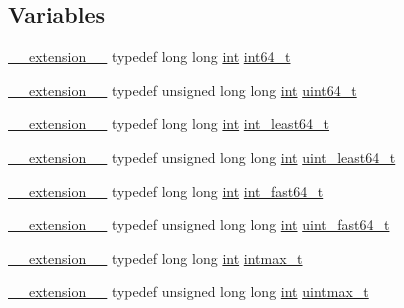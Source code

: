 \subsection*{Variables}
\begin{DoxyCompactItemize}
\item 
\hyperlink{cdefs_8h_a586c6a171eb0104d519dc0eda5284ef7}{\+\_\+\+\_\+extension\+\_\+\+\_\+} typedef long long \hyperlink{xmltok_8h_a5a0d4a5641ce434f1d23533f2b2e6653}{int} \hyperlink{win_2_l_a_d_s_p_a__plugins-win_2glibc__includes_2stdint_8h_a10c9f200669fac0da850346f08196ed6}{int64\+\_\+t}
\item 
\hyperlink{cdefs_8h_a586c6a171eb0104d519dc0eda5284ef7}{\+\_\+\+\_\+extension\+\_\+\+\_\+} typedef unsigned long long \hyperlink{xmltok_8h_a5a0d4a5641ce434f1d23533f2b2e6653}{int} \hyperlink{win_2_l_a_d_s_p_a__plugins-win_2glibc__includes_2stdint_8h_a246b33e9233313797d7dc7d7700d2148}{uint64\+\_\+t}
\item 
\hyperlink{cdefs_8h_a586c6a171eb0104d519dc0eda5284ef7}{\+\_\+\+\_\+extension\+\_\+\+\_\+} typedef long long \hyperlink{xmltok_8h_a5a0d4a5641ce434f1d23533f2b2e6653}{int} \hyperlink{win_2_l_a_d_s_p_a__plugins-win_2glibc__includes_2stdint_8h_a259be097d134995315efb0e4fcbfea9d}{int\+\_\+least64\+\_\+t}
\item 
\hyperlink{cdefs_8h_a586c6a171eb0104d519dc0eda5284ef7}{\+\_\+\+\_\+extension\+\_\+\+\_\+} typedef unsigned long long \hyperlink{xmltok_8h_a5a0d4a5641ce434f1d23533f2b2e6653}{int} \hyperlink{win_2_l_a_d_s_p_a__plugins-win_2glibc__includes_2stdint_8h_acec37aa98922d60b79f09bb8f3da383f}{uint\+\_\+least64\+\_\+t}
\item 
\hyperlink{cdefs_8h_a586c6a171eb0104d519dc0eda5284ef7}{\+\_\+\+\_\+extension\+\_\+\+\_\+} typedef long long \hyperlink{xmltok_8h_a5a0d4a5641ce434f1d23533f2b2e6653}{int} \hyperlink{win_2_l_a_d_s_p_a__plugins-win_2glibc__includes_2stdint_8h_a1e054ce166a0bc2f7af5fa4431abfb65}{int\+\_\+fast64\+\_\+t}
\item 
\hyperlink{cdefs_8h_a586c6a171eb0104d519dc0eda5284ef7}{\+\_\+\+\_\+extension\+\_\+\+\_\+} typedef unsigned long long \hyperlink{xmltok_8h_a5a0d4a5641ce434f1d23533f2b2e6653}{int} \hyperlink{win_2_l_a_d_s_p_a__plugins-win_2glibc__includes_2stdint_8h_a579cef9bed8d6c81908a78149019c8d6}{uint\+\_\+fast64\+\_\+t}
\item 
\hyperlink{cdefs_8h_a586c6a171eb0104d519dc0eda5284ef7}{\+\_\+\+\_\+extension\+\_\+\+\_\+} typedef long long \hyperlink{xmltok_8h_a5a0d4a5641ce434f1d23533f2b2e6653}{int} \hyperlink{win_2_l_a_d_s_p_a__plugins-win_2glibc__includes_2stdint_8h_a5bf00657278276f83f23e629a2813953}{intmax\+\_\+t}
\item 
\hyperlink{cdefs_8h_a586c6a171eb0104d519dc0eda5284ef7}{\+\_\+\+\_\+extension\+\_\+\+\_\+} typedef unsigned long long \hyperlink{xmltok_8h_a5a0d4a5641ce434f1d23533f2b2e6653}{int} \hyperlink{win_2_l_a_d_s_p_a__plugins-win_2glibc__includes_2stdint_8h_a8a33366af062ae1b08dd12d95c5e6692}{uintmax\+\_\+t}
\end{DoxyCompactItemize}


